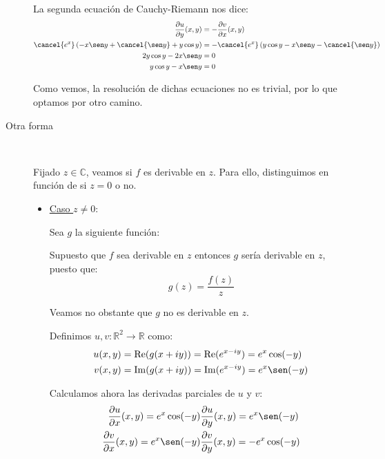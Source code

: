 \documentclass[12pt]{article}
\renewcommand{\Re}{\operatorname{Re}} %
\renewcommand{\Im}{\operatorname{Im}}
\begin{document}
\begin{ejercicio}[3 puntos]
\begin{description}
        La segunda ecuación de Cauchy-Riemann nos dice:
        \begin{align*}
            \frac{\partial u}{\partial y}(x,y) &= -\frac{\partial v}{\partial x}(x,y)\\
            \cancel{e^x}\left(-x\sen y + \cancel{\sen y} + y\cos y\right) &= -\cancel{e^x}\left(y\cos y - x\sen y - \cancel{\sen y}\right)\\
            2y\cos y - 2x\sen y &= 0\\
            y\cos y - x\sen y &= 0
        \end{align*}

        Como vemos, la resolución de dichas ecuaciones no es trivial, por lo que optamos por otro camino.


        \item[Otra forma]~
        
        Fijado $z\in \mathbb{C}$, veamos si $f$ es derivable en $z$. Para ello, distinguimos en función de si $z=0$ o no.
        \begin{itemize}
            \item \ul{Caso $z\neq 0$}:
            
            Sea $g$ la siguiente función:

            Supuesto que $f$ sea derivable en $z$ entonces $g$ sería derivable en $z$, puesto que:
            \begin{equation*}
                g(z) = \frac{f(z)}{z}
            \end{equation*}

            Veamos no obstante que $g$ no es derivable en $z$.
                
                Definimos $u,v:\mathbb{R}^2\to\mathbb{R}$ como:
                \begin{align*}
                    u(x,y) &= \Re(g(x+iy)) = \Re(e^{x-iy}) = e^x\cos (-y)\\
                    v(x,y) &= \Im(g(x+iy)) = \Im(e^{x-iy}) = e^x\sen (-y)
                \end{align*}

                Calculamos ahora las derivadas parciales de $u$ y $v$:
                \begin{align*}
                    \frac{\partial u}{\partial x}(x,y) = e^x\cos (-y)&
                    \frac{\partial u}{\partial y}(x,y) = e^x\sen (-y)\\
                    \frac{\partial v}{\partial x}(x,y) = e^x\sen (-y)&
                    \frac{\partial v}{\partial y}(x,y) = -e^x\cos (-y)
                \end{align*}


\end{itemize}
\end{description}
\end{ejercicio}
\end{document}

